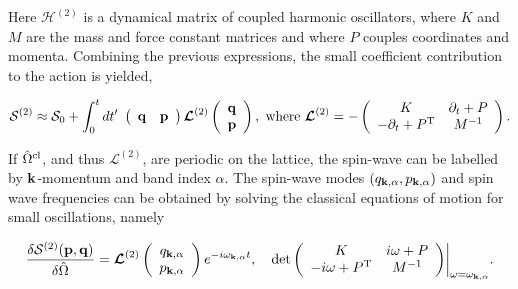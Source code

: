 \documentclass{homework}
\begin{document}
Here $\bm{\mathcal{H}}^{(2)}$ is a dynamical matrix of coupled harmonic oscillators, where $K$ and $M$ are the mass and force constant matrices and where $P$ couples coordinates and momenta. Combining the previous expressions, the small coefficient contribution to the action is yielded,

\begin{equation}
    \mathcal{S}^{(2)} \approx \mathcal{S}_0 + \int_{0}^t dt' \textnormal{ } \left(\begin{array}{cc}
          {\bf q} & {\bf p}
    \end{array}\right) \bm{\mathcal{L}}^{(2)} \left( \begin{array}{c}
          {\bf q} \\
          {\bf p}
    \end{array}\right), \textnormal{ where } \bm{\mathcal{L}}^{(2)} = - \left(\begin{array}{cc}
        K & \partial_{t} + P \\
        - \partial_{t} + P^{\textnormal{T}} & M^{-1} 
    \end{array}\right).
\end{equation}

If $\hat{\Omega}^{\textnormal{cl}}$, and thus $\bm{\mathcal{L}}^{(2)}$, are periodic on the lattice, the spin-wave can be labelled by ${\bf k}$-momentum and band index $\alpha$. 
The spin-wave modes $(q_{{\bf k}, \alpha}, p_{{\bf k}, \alpha})$ and spin wave frequencies can be obtained by solving the classical equations of motion for small oscillations, namely 

\begin{equation}
\begin{split}
     \frac{\delta \mathcal{S}^{(2)} ({\bf p}, {\bf q})}{\delta \hat{\Omega}} = \bm{\mathcal{L}}^{(2)}  \left(\begin{array}{c}
         q_{{\bf k}, \alpha}  \\
         p_{{\bf k}, \alpha} 
    \end{array}\right) e^{-i \omega_{{\bf k}, \alpha} t}, \quad 
    \det \bigg(\begin{array}{cc}
        K & i\omega + P  \\
        -i\omega + P^{\textnormal{T}} & M^{-1} 
    \end{array}\bigg)\bigg|_{\omega = \omega_{{\bf k}, \alpha}}.
\end{split}
\label{spin_wave_path_int_small_osc_approx}
\end{equation}
\end{document}
